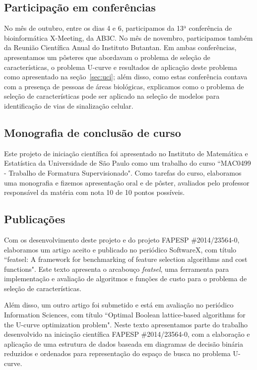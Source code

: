 \documentclass[12pt]{article}
\newcommand{\toolname}[1]{\textit{#1}}
\begin{document}
\subsection{Participação em conferências}
No mês de outubro, entre os dias 4 e 6, participamos da 13$^\text{a}$ 
conferência de bioinformática X-Meeting, da AB3C. No mês de novembro, 
participamos também da Reunião Científica Anual do Instituto Butantan. 
Em ambas conferências, apresentamos um pôsteres que abordavam o problema 
de seleção de características, o problema U-curve e resultados de 
aplicação deste problema como apresentado na seção~\ref{sec:uci}; além
disso, como estas conferência contava com a presença de pessoas de áreas
biológicas, explicamos como o problema de seleção de características
pode ser aplicado na seleção de modelos para identificação de vias de 
sinalização celular.

\subsection{Monografia de conclusão de curso}
Este projeto de iniciação científica foi apresentado no Instituto de
Matemática e Estatística da Universidade de São Paulo como um trabalho
do curso ``MAC0499 - Trabalho de Formatura Supervisionado". Como
tarefas do curso, elaboramos uma monografia e fizemos apresentação oral
e de pôster, avaliados pelo professor responsável da matéria com nota 10 
de 10 pontos possíveis.

\subsection{Publicações}
Com os desenvolvimento deste projeto e do projeto FAPESP \#2014/23564-0,
elaboramos um artigo aceito e publicado no periódico SoftwareX, com
título ``featsel: A framework for benchmarking of feature selection 
algorithms and cost functions". Este texto apresenta o arcabouço 
\toolname{featsel}, uma ferramenta para implementação e avaliação de 
algoritmos e funções de custo para o problema de seleção de 
características. 

Além disso, um outro artigo foi submetido e está em avaliação no 
periódico Information Sciences, com título ``Optimal Boolean 
lattice-based algorithms for the U-curve optimization problem". Neste
texto apresentamos parte do trabalho desenvolvido na iniciação 
científica FAPESP \#2014/23564-0, com a elaboração e aplicação de uma 
estrutura de dados baseada em diagramas de decisão binária reduzidos e 
ordenados para representação do espaço de busca no problema U-curve.
\end{document}
